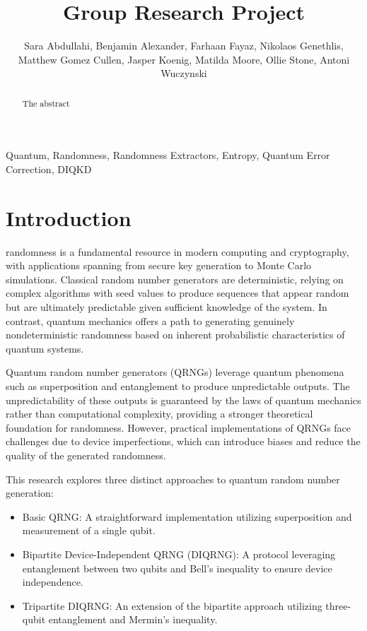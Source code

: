 \documentclass[lettersize,journal]{IEEEtran}
\begin{document}
\title{Group Research Project}

\author{Sara Abdullahi, Benjamin Alexander, Farhaan Fayaz, Nikolaos Genethlis, Matthew Gomez Cullen, Jasper Koenig, Matilda Moore, Ollie Stone, Antoni Wuczynski}

%
{}

\maketitle

\begin{abstract}
The abstract
\end{abstract}

\begin{IEEEkeywords}
Quantum, Randomness, Randomness Extractors, Entropy, Quantum Error Correction, DIQKD
\end{IEEEkeywords}

\section{Introduction}
 randomness is a fundamental resource in modern computing and cryptography, with applications spanning from secure key generation to Monte Carlo simulations. Classical random number generators are deterministic, relying on complex algorithms with seed values to produce sequences that appear random but are ultimately predictable given sufficient knowledge of the system. In contrast, quantum mechanics offers a path to generating genuinely nondeterministic randomness based on inherent probabilistic characteristics of quantum systems.

Quantum random number generators (QRNGs) leverage quantum phenomena such as superposition and entanglement to produce unpredictable outputs. The unpredictability of these outputs is guaranteed by the laws of quantum mechanics rather than computational complexity, providing a stronger theoretical foundation for randomness. However, practical implementations of QRNGs face challenges due to device imperfections, which can introduce biases and reduce the quality of the generated randomness.

This research explores three distinct approaches to quantum random number generation:
\begin{itemize}
    \item Basic QRNG: A straightforward implementation utilizing superposition and measurement of a single qubit.
    \item Bipartite Device-Independent QRNG (DIQRNG): A protocol leveraging entanglement between two qubits and Bell's inequality to ensure device independence.
    \item Tripartite DIQRNG: An extension of the bipartite approach utilizing three-qubit entanglement and Mermin's inequality.
\end{itemize}
\end{document}
